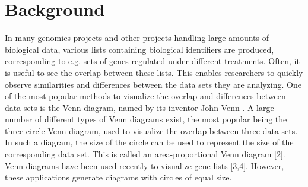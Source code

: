 \documentclass{bmcart}
\begin{document}



\section*{Background}
In many genomics projects and other projects handling large amounts of biological data, various lists 
containing biological identifiers are produced, corresponding to e.g. sets of genes regulated under different 
treatments. Often, it is useful to see the overlap between these lists. This enables researchers to quickly 
observe similarities and differences between the data sets they are analyzing. One of the most popular methods 
to visualize the overlap and differences between data sets is the Venn diagram, named by its inventor John Venn 
\cite{Venn1880}. A large number of different types of Venn diagrams exist, the most popular being the three-circle 
Venn diagram, used to visualize the overlap between three data sets. In such a diagram, the size of the circle can 
be used to represent the size of the corresponding data set. This is called an area-proportional Venn diagram 
[2]. Venn diagrams have been used recently to visualize gene lists [3,4]. However, these applications generate 
diagrams with circles of equal size. 
\end{document}
